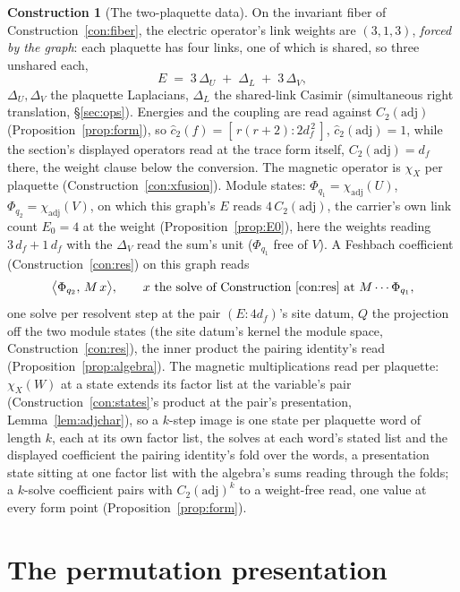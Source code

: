\documentclass[11pt]{article}
\theoremstyle{definition}
\newtheorem{construction}{Construction}
\begin{document}
\begin{construction}[The two-plaquette data]\label{con:twoplaq}
On the invariant fiber of Construction~\ref{con:fiber}, the electric
operator's link weights are $(3,1,3)$, \emph{forced by the graph}: each plaquette
has four links, one of which is shared, so three unshared each,
\[
E \;=\; 3\,\Delta_U \;+\; \Delta_L \;+\; 3\,\Delta_V ,
\]
$\Delta_U,\Delta_V$ the plaquette Laplacians, $\Delta_L$ the
shared-link Casimir (simultaneous right translation, \S\ref{sec:ops}).
Energies and the coupling are read against $C_2(\mathrm{adj})$
(Proposition~\ref{prop:form}), so
$\hat c_2(f)=[\,r(r+2):2d_f^{\,2}\,]$,
$\hat c_2(\mathrm{adj})=1$, while the section's displayed operators
read at the trace form itself, $C_2(\mathrm{adj})=d_f$ there, the
weight clause below the conversion. The magnetic operator is $\chi_X$ per plaquette
(Construction~\ref{con:xfusion}).
Module states: $\Phi_{q_1}=\chi_{\mathrm{adj}}(U)$,
$\Phi_{q_2}=\chi_{\mathrm{adj}}(V)$, on which this graph's $E$ reads
$4\,C_2(\mathrm{adj})$, the
carrier's own link count $E_0=4$ at the weight
(Proposition~\ref{prop:E0}), here the weights reading
$3\,d_f+1\,d_f$ with the $\Delta_V$ read the sum's unit
($\Phi_{q_1}$ free of $V$). A Feshbach coefficient
(Construction~\ref{con:res}) on this
graph reads
\[
\big\langle \Phi_{q_2},\, M\,x\big\rangle,
\qquad
x\ \text{the solve of Construction~\ref{con:res} at }M\cdots\Phi_{q_1} ,
\]
one solve per resolvent step at the pair $(E\!:\!4d_f)$'s site
datum, $Q$ the projection off the two module
states (the site datum's kernel the module space,
Construction~\ref{con:res}), the inner product the pairing
identity's read (Proposition~\ref{prop:algebra}). The magnetic
multiplications read per plaquette: $\chi_X(W)$ at a state extends
its factor list at the variable's pair
(Construction~\ref{con:states}'s product at the pair's
presentation, Lemma~\ref{lem:adjchar}), so a $k$-step image is one state
per plaquette word of length $k$, each at its own factor list, the
solves at each word's stated list and the displayed coefficient
the pairing identity's fold over the words, a presentation state
sitting at one factor list with the algebra's sums reading through
the folds; a $k$-solve coefficient pairs with
$C_2(\mathrm{adj})^{k}$ to a weight-free read, one value at every
form point (Proposition~\ref{prop:form}).
\end{construction}

\section{The permutation presentation}
\end{document}
